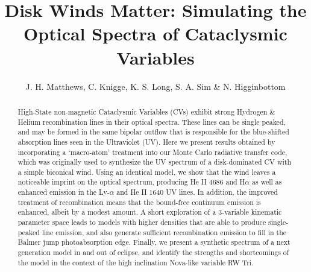 \documentclass[preprint, a4paper, 11pt]{aastex}
\begin{document}

\renewcommand{\labelitemi}{$\bullet$}
\def\py{\textsc{Python} }
\def\tar{\textsc{Tardis} }
\def\cld{\textsc{Cloudy} }
\def\civ{C~\textsc{iv} }
\def\araa{ARAA}
\def\nat{Nature}
\def\apjl{ApJ Letters}
\def\aapr{AAPR}
\def\ssr{SSR}
\def\apj{ApJ}
\def\pasp{PASP}
\def\aap{A\&A}
\def\mnras{MNRAS}
\def\aj{AJ}
\def\rmxaa{RMXAA}

\def\heiiopt{He~\textsc{ii}~$\lambda4686{\rm \AA}$}
\def\heiiuv{He~\textsc{ii}~$\lambda1640{\rm \AA}$}
\def\heiioptnew{He~\textsc{ii}~$\lambda3202{\rm \AA}$}
\def\la{Ly-$\alpha$}
\def\ha{H$\alpha$}
\def\hb{H$\beta$}

%
%


\title{Disk Winds Matter: Simulating the Optical Spectra of Cataclysmic Variables}
\author{J. H. Matthews, C. Knigge, K. S. Long, S. A. Sim \& N. Higginbottom}


%
%

\begin{abstract}
High-State non-magnetic Cataclysmic Variables (CVs) 
exhibit strong Hydrogen \& Helium recombination lines in their optical 
spectra. These lines can be single peaked, and may be formed 
in the same bipolar outflow that is responsible for the
blue-shifted absorption lines seen in the Ultraviolet (UV).
Here we present results obtained by incorporating a `macro-atom' treatment into
our Monte Carlo radiative transfer code, which was
originally used to synthesize the UV spectrum of a disk-dominated CV 
with a simple biconical wind. Using an identical model, we show that the wind leaves a noticeable imprint 
on the optical spectrum, producing He II 4686 and H${\alpha}$ as well as
enhanced emission in the Ly-$\alpha$ and He II $1640$ UV lines.
In addition, the improved treatment of recombination means that the bound-free continuum
emission is enhanced, albeit by a modest amount.
A short exploration of a 3-variable kinematic parameter space leads to models with higher densities 
that are able to produce single-peaked line emission, and also generate sufficient recombination emission
to fill in the Balmer jump photoabsorption edge. 
Finally, we present a synthetic spectrum of a next generation model in and out of eclipse,
and identify the strengths and shortcomings of the model in the context of the high inclination
Nova-like variable RW Tri.
\end{abstract}
\end{document}
